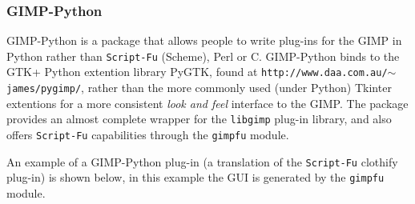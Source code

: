 \documentclass[twoside,11pt]{article}
\newcommand{\htmladdnormallink}[2]{#1}
\newcommand{\latex}[1]{#1}
\begin{document}
\subsubsection{GIMP-Python}

\htmladdnormallink{GIMP-Python}{http://www.daa.com.au/~james/pygimp/} is a package that allows people to write plug-ins for the GIMP in Python rather than {\tt Script-Fu} (Scheme), Perl or C. GIMP-Python binds to the \htmladdnormallink{GTK+}{http://www.gtk.org} Python extention library \htmladdnormallink{PyGTK}{http://www.daa.com.au/~james/pygtk/}\latex{, found at {\tt http://www.daa.com.au/$\sim$james/pygimp/},} rather than the more commonly used (under Python) Tkinter extentions for a more consistent {\em look and feel} interface to the GIMP. The package provides an almost complete wrapper for the {\tt libgimp} plug-in library, and also offers {\tt Script-Fu} capabilities through the {\tt gimpfu} module. 

An example of a GIMP-Python plug-in (a translation of the {\tt Script-Fu} clothify plug-in) is shown below, in this example the GUI is generated by the {\tt gimpfu} module.
\end{document}
